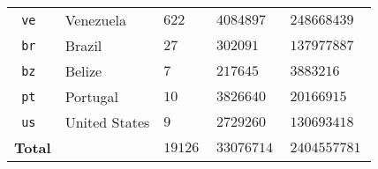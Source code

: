 \begin{tabular}{ll R{0.7in}R{1in}R{1in}}
\texttt{~ve} & Venezuela &  $\SI{622}{}$ & $\SI{4084897}{}$ & $\SI{248668439}{}$ \\
\hline
{}\Tstrut\texttt{~br} & Brazil &  $\SI{27}{}$ & $\SI{302091}{}$ & $\SI{137977887}{}$ \\
\texttt{~bz} & Belize &  $\SI{7}{}$ & $\SI{217645}{}$ & $\SI{3883216}{}$ \\
\texttt{~pt} & Portugal &  $\SI{10}{}$ & $\SI{3826640}{}$ & $\SI{20166915}{}$ \\
\texttt{~us} & United States &  $\SI{9}{}$ & $\SI{2729260}{}$ & $\SI{130693418}{}$ \\
\hline
\Tstrut\textbf{Total} &&  $\SI{19126}{}$ & $\SI{33076714}{}$ & $\SI{2404557781}{}$
\end{tabular}
